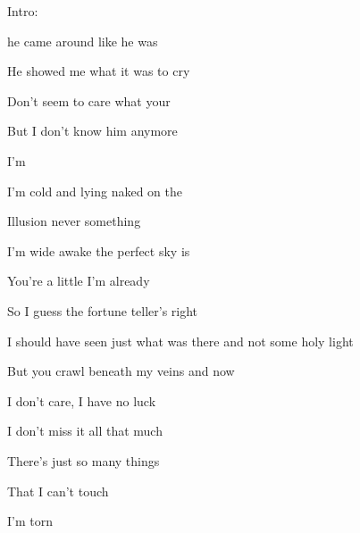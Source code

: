 
Intro: 

    

\zs

             he came around like he was 

            He showed me what it was to cry


             Don't seem to care what your 

            But I don't know him anymore 





                 I'm 
\ks

\zr
               

             I'm cold and  lying naked on the 

             Illusion never  something 

             I'm wide awake  the perfect sky is 

             You're a little  I'm already  
\kr

\zs
            So I guess the fortune teller's right

            I should have seen just what was there and not some holy light

            But you crawl beneath my veins and now

                I don't care, I have no luck

                I don't miss it all that much 

                There's just so many things

                That I can't touch

                I'm torn
\ks

